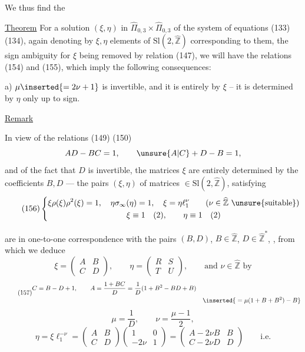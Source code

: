 We thus find the

\uline{Theorem} For a solution $(\xi,\eta)$ in $\widehat{\Pi}_{0,3}\times\widehat{\Pi}_{0,3}$ of the system of equations (133) (134), again denoting by $\xi,\eta$ elements of $\mathrm{Sl}(2,\widehat{\mathbb Z})$ corresponding to them, the sign ambiguity for $\xi$ being removed by relation (147), we will have the relations (154) and (155), which imply the following consequences:

a) $\mu\inserted{=2\nu+1}$ is invertible, and it is entirely  by $\xi$ -- it is determined by $\eta$ only up to sign.


\uline{Remark}

In view of the relations (149) (150)
\[
AD-BC=1,\qquad \unsure{A|C}+D-B=1,
\]
and of the fact that $D$ is invertible, the matrices $\xi$ are entirely determined by the coefficients $B,D$ --- the pairs $(\xi,\eta)$ of matrices $\in\mathrm{Sl}(2,\widehat{\mathbb Z})$, satisfying
\[
\tag{156}
\left\{\begin{gathered}
\xi\rho(\xi)\rho^2(\xi)=1,\quad
\eta\sigma_\infty(\eta)=1,\quad
\xi=\eta\ell_1^\nu
\qquad(\nu\in\widehat{\mathbb Z}\ \text{\unsure{suitable}})\\
\xi\equiv1\quad(2),\qquad\eta\equiv1\quad(2)
\end{gathered}\right.
\]


are in one-to-one correspondence with the pairs $(B,D)$, $B\in\widehat{\mathbb Z}$, $D\in\widehat{\mathbb Z}^{*}$, , from which we deduce
\[
\xi=\begin{pmatrix}A&B\\C&D\end{pmatrix},\qquad
\eta=\begin{pmatrix}R&S\\T&U\end{pmatrix},\qquad
\text{and }\nu\in\widehat{\mathbb Z}\text{ by}
\]
\[
\tag{157}
\begin{aligned}
C&=B-D+1,\qquad
A=\frac{1+BC}{D}=\frac1D(1+B^2-BD+B)\\
&&\inserted{{}=\mu(1+B+B^2)-B}
\end{aligned}
\]
\[
\tag{158}
\mu=\frac1D,\qquad\nu=\frac{\mu-1}{2},
\]
\[
\eta=\xi\ell_1^{-\nu}
=\begin{pmatrix}A&B\\C&D\end{pmatrix}
\begin{pmatrix}1&0\\-2\nu&1\end{pmatrix}
=\begin{pmatrix}A-2\nu B&B\\C-2\nu D&D\end{pmatrix}
\qquad\text{i.e.}
\]

